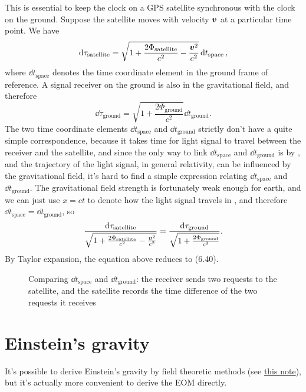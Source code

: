 \documentclass[hyperref, a4paper]{article}
\newcommand{\grnote}{\href{../relativity/relativistic.pdf}{this note}}
\begin{document}
This is essential to keep the clock on a GPS satellite synchronous with the clock on the ground. 
Suppose the satellite moves with velocity $\vb*{v}$ at a particular time point. We have 
\[
    \dd{\tau_\text{satellite}} = \sqrt{1 + \frac{2 \Phi_\text{satellite}}{c^2} - \frac{\vb*{v}^2}{c^2}} \dd{t}_\text{space},
\]
where $\dd{t}_\text{space}$ denotes the time coordinate element in the ground frame of reference.
A signal receiver on the ground is also in the gravitational field, and therefore 
\[
    \dd{\tau_\text{ground}} = \sqrt{1 + \frac{2 \Phi_\text{ground}}{c^2}} \dd{t_\text{ground}}.
\]
The two time coordinate elements $\dd{t_\text{space}}$ and $\dd{t_\text{ground}}$ strictly don't have a 
quite simple correspondence, because it takes time for light signal to travel between the receiver 
and the satellite, and since the only way to link $\dd{t_\text{space}}$ and $\dd{t_\text{ground}}$ 
is by , and the trajectory of the light signal, in general relativity,
can be influenced by the gravitational field, it's hard to find a simple expression relating  
$\dd{t_\text{space}}$ and $\dd{t_\text{ground}}$. The gravitational field strength is fortunately
weak enough for earth, and we can just use $x = ct$ to denote how the light signal travels in 
, and therefore $\dd{t_\text{space}} = \dd{t_\text{ground}}$, so 
\begin{equation}
    \frac{\dd{\tau_\text{satellite}}}{\sqrt{1 + \frac{2 \Phi_\text{satellite}}{c^2} - \frac{\vb*{v}^2}{c^2}}} = \frac{\dd{\tau_\text{ground}}}{\sqrt{1 + \frac{2 \Phi_\text{ground}}{c^2}}}.
\end{equation}
By Taylor expansion, the equation above reduces to (6.40).

\begin{figure}
    \centering
    
    \caption{Comparing $\dd{t_\text{space}}$ and $\dd{t_\text{ground}}$: the receiver sends two requests 
    to the satellite, and the satellite records the time difference of the two requests it receives}
    \label{fig:comparing-element}
\end{figure}


\section{Einstein's gravity}

It's possible to derive Einstein's gravity by field theoretic methods (see \grnote), 
but it's actually more convenient to derive the EOM directly. 
\end{document}
